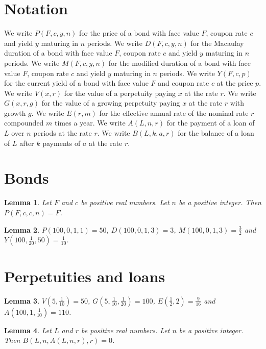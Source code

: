 \documentclass{article}
\newtheorem{lemma}{Lemma}
\begin{document}
\section{Notation}

We write $P(F,c,y,n)$ for the price of a bond with face value $F$, coupon rate $c$ and yield $y$ maturing in $n$ periods.
We write $D(F,c,y,n)$ for the Macaulay duration of a bond with face value $F$, coupon rate $c$ and yield $y$ maturing in $n$ periods.
We write $M(F,c,y,n)$ for the modified duration of a bond with face value $F$, coupon rate $c$ and yield $y$ maturing in $n$ periods.
We write $Y(F,c,p)$ for the current yield of a bond with face value $F$ and coupon rate $c$ at the price $p$.
We write $V(x,r)$ for the value of a perpetuity paying $x$ at the rate $r$.
We write $G(x,r,g)$ for the value of a growing perpetuity paying $x$ at the rate $r$ with growth $g$.
We write $E(r,m)$ for the effective annual rate of the nominal rate $r$ compounded $m$ times a year.
We write $A(L,n,r)$ for the payment of a loan of $L$ over $n$ periods at the rate $r$.
We write $B(L,k,a,r)$ for the balance of a loan of $L$ after $k$ payments of $a$ at the rate $r$.

\section{Bonds}

\begin{lemma}\label{par}
Let $F$ and $c$ be positive real numbers. Let $n$ be a positive integer. Then $P(F,c,c,n)=F$.
\end{lemma}

\begin{lemma}\label{zero}
$P(100,0,1,1)=50$, $D(100,0,1,3)=3$, $M(100,0,1,3)=\frac32$ and $Y(100,\frac{1}{20},50)=\frac{1}{10}$.
\end{lemma}

\section{Perpetuities and loans}

\begin{lemma}\label{perpetuities}
$V(5,\frac{1}{10})=50$, $G(5,\frac{1}{10},\frac{1}{20})=100$, $E(\frac12,2)=\frac{9}{16}$ and $A(100,1,\frac{1}{10})=110$.
\end{lemma}

\begin{lemma}\label{amortization}
Let $L$ and $r$ be positive real numbers. Let $n$ be a positive integer. Then $B(L,n,A(L,n,r),r)=0$.
\end{lemma}
\end{document}
